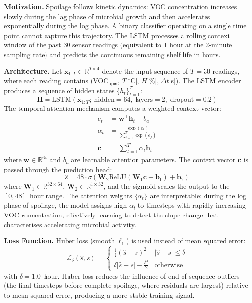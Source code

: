 \documentclass{ieeeaccess}
\begin{document}
\textbf{Motivation.} Spoilage follows kinetic dynamics: VOC concentration increases slowly during the lag phase of microbial growth and then accelerates exponentially during the log phase. A binary classifier operating on a single time point cannot capture this trajectory. The LSTM processes a rolling context window of the past 30 sensor readings (equivalent to 1 hour at the 2-minute sampling rate) and predicts the continuous remaining shelf life in hours.

\textbf{Architecture.} Let $\mathbf{x}_{1:T} \in \mathbb{R}^{T \times 4}$ denote the input sequence of $T = 30$ readings, where each reading contains (VOC$_{\text{ppm}}$, $T$[$^{\circ}$C], $H$[\%], $\Delta t$[s]). The LSTM encoder produces a sequence of hidden states $\{h_t\}_{t=1}^{T}$:
\begin{equation}
  \mathbf{H} = \text{LSTM}(\mathbf{x}_{1:T};\; \text{hidden}=64,\; \text{layers}=2,\; \text{dropout}=0.2)
\end{equation}
The temporal attention mechanism computes a weighted context vector:
\begin{align}
  e_t &= \mathbf{w}^\top \mathbf{h}_t + b_a \label{eq:attn_score}\\
  \alpha_t &= \frac{\exp(e_t)}{\sum_{j=1}^{T} \exp(e_j)} \label{eq:attn_weight}\\
  \mathbf{c} &= \sum_{t=1}^{T} \alpha_t \mathbf{h}_t \label{eq:context}
\end{align}
where $\mathbf{w} \in \mathbb{R}^{64}$ and $b_a$ are learnable attention parameters. The context vector $\mathbf{c}$ is passed through the prediction head:
\begin{equation}
  \hat{s} = 48 \cdot \sigma\!\left(\mathbf{W}_2 \text{ReLU}(\mathbf{W}_1 \mathbf{c} + \mathbf{b}_1) + \mathbf{b}_2\right)
\end{equation}
where $\mathbf{W}_1 \in \mathbb{R}^{32 \times 64}$, $\mathbf{W}_2 \in \mathbb{R}^{1 \times 32}$, and the sigmoid scales the output to the $[0, 48]$~hour range. The attention weights $\{\alpha_t\}$ are interpretable: during the log phase of spoilage, the model assigns high $\alpha_t$ to timesteps with rapidly increasing VOC concentration, effectively learning to detect the slope change that characterises accelerating microbial activity.

\textbf{Loss Function.} Huber loss (smooth $\ell_1$) is used instead of mean squared error:
\begin{equation}
  \mathcal{L}_{\delta}(\hat{s}, s) = \begin{cases}
    \frac{1}{2}(\hat{s}-s)^2 & |\hat{s}-s| \leq \delta \\
    \delta|\hat{s}-s| - \frac{\delta^2}{2} & \text{otherwise}
  \end{cases}
\end{equation}
with $\delta = 1.0$~hour. Huber loss reduces the influence of end-of-sequence outliers (the final timesteps before complete spoilage, where residuals are largest) relative to mean squared error, producing a more stable training signal.
\end{document}
